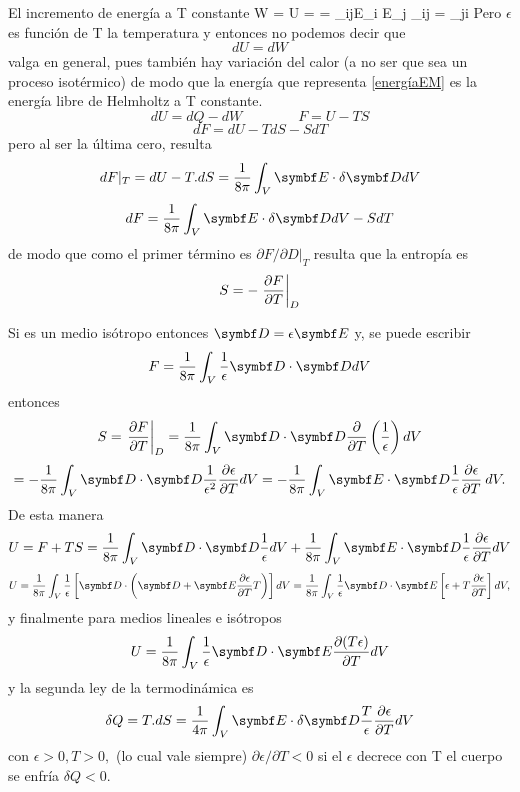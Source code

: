 \documentclass[10pt,oneside]{CBFT_book}
\begin{document}
El incremento de energía a T constante
\be
	\delta W = U =  \cdot{} =  \epsilon_{ij}E_i E_j	\qquad
	 \; \epsilon_{ij} = \epsilon_{ji} \; 
	\label{energíaEM}
\ee
Pero $\epsilon$ es función de T la temperatura y entonces no podemos decir que
\[
	dU = dW
\]
valga en general, pues también hay variación del calor (a no ser que sea un proceso isotérmico) de modo que 
la energía que representa \eqref{energíaEM} es la energía libre de Helmholtz a T constante.
\[
	dU = dQ - dW \qquad \qquad F = U - TS
\]
\[
	dF = dU - TdS - SdT
\]
pero al ser la última cero, resulta
\[
	dF|_T = dU - T.dS = \frac{1}{8\pi} \int_V \vb{E}\cdot\delta\vb{D} dV
\]
\[
	dF = \frac{1}{8\pi} \int_V \vb{E}\cdot\delta\vb{D} dV - SdT
\]
de modo que como el primer término es $\partial F / \partial D |_T$ resulta que 
la entropía es
\[
	S = -\left.\frac{\partial^{\hspace{-0.05em}} {F}}{\partial {T}^{\hspace{-0.05em}}}\right|_D
\]

Si es un medio isótropo entonces $\vb{D} = \epsilon \vb{E}$ y, se puede escribir 
\[
	F = \frac{1}{8\pi} \int_V \frac{1}{\epsilon}\vb{D}\cdot\vb{D} dV
\]
entonces
\[
	S = \left.\dpar{F}{T}\right|_D	= \frac{1}{8\pi} \int_V \vb{D}\cdot\vb{D} 
		\dpar{}{T} \left( \frac{1}{\epsilon} \right) dV
\]
\[
	=  - \frac{1}{8\pi} \int_V \vb{D}\cdot\vb{D} \frac{1}{\epsilon^2} \dpar{\epsilon}{T}  dV =
	-\frac{1}{8\pi} \int_V \vb{E}\cdot\vb{D} \frac{1}{\epsilon} \dpar{\epsilon}{T} \: dV. 
\]
De esta manera  
\[
	U = F + TS = \frac{1}{8\pi} \int_V \vb{D}\cdot\vb{D} \frac{1}{\epsilon} dV  +
	\frac{1}{8\pi} \int_V \vb{E}\cdot\vb{D} \frac{1}{\epsilon} \dpar{\epsilon}{T}  dV 
\]
\[
	U = \frac{1}{8\pi} \int_V \frac{1}{\epsilon} \left[ \vb{D}\cdot \left( \vb{D} + 
		\vb{E} \dpar{\epsilon}{T} T \right) \right] dV  = \frac{1}{8\pi} \int_V \frac{1}{\epsilon}
		\vb{D}\cdot \vb{E} \left[ \epsilon + T \dpar{\epsilon}{T}  \right] dV,
\]
y finalmente para medios lineales e isótropos
\[
	U = \frac{1}{8\pi} \int_V \frac{1}{\epsilon} \vb{D}\cdot \vb{E} \dpar{ (T \epsilon) }{T} dV
\]
y la segunda ley de la termodinámica es
\[
	\delta Q = T.dS = \frac{1}{4\pi} \int_V \vb{E}\cdot\delta\vb{D} \frac{T}{\epsilon}
	\dpar{\epsilon}{T} dV
\]
con $\epsilon > 0, T > 0,$ (lo cual vale siempre) $ \partial \epsilon / \partial T < 0$ si el $\epsilon$ 
decrece con T el cuerpo se enfría $\delta Q < 0$.
\end{document}
